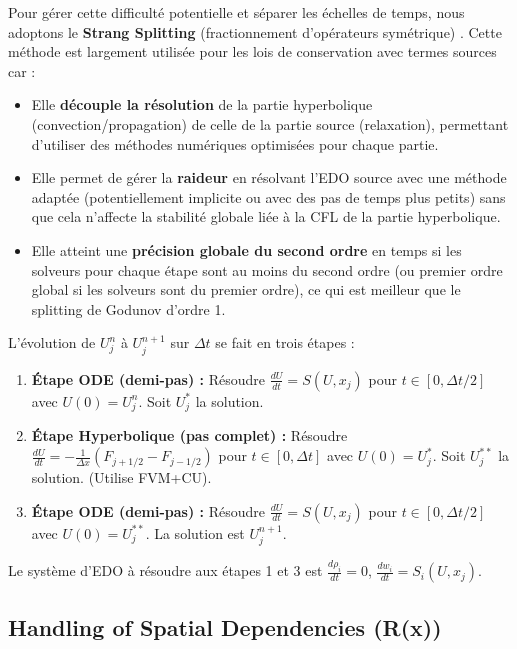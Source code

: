 Pour gérer cette difficulté potentielle et séparer les échelles de temps, nous adoptons le \textbf{Strang Splitting} (fractionnement d'opérateurs symétrique) \cite{Strang1968}. Cette méthode est largement utilisée pour les lois de conservation avec termes sources \cite{LeVeque2002} car :
\begin{itemize}
    \item Elle \textbf{découple la résolution} de la partie hyperbolique (convection/propagation) de celle de la partie source (relaxation), permettant d'utiliser des méthodes numériques optimisées pour chaque partie.
    \item Elle permet de gérer la \textbf{raideur} en résolvant l'EDO source avec une méthode adaptée (potentiellement implicite ou avec des pas de temps plus petits) sans que cela n'affecte la stabilité globale liée à la CFL de la partie hyperbolique.
    \item Elle atteint une \textbf{précision globale du second ordre} en temps si les solveurs pour chaque étape sont au moins du second ordre (ou premier ordre global si les solveurs sont du premier ordre), ce qui est meilleur que le splitting de Godunov d'ordre 1.
\end{itemize}
L'évolution de \( U_j^n \) à \( U_j^{n+1} \) sur \( \Delta t \) se fait en trois étapes :
\begin{enumerate}
    \item \textbf{Étape ODE (demi-pas) :} Résoudre \( \frac{dU}{dt} = S(U, x_j) \) pour \( t \in [0, \Delta t / 2] \) avec \( U(0) = U_j^n \). Soit \( U_j^* \) la solution.
    \item \textbf{Étape Hyperbolique (pas complet) :} Résoudre \( \frac{dU}{dt} = -\frac{1}{\Delta x} ( F_{j+1/2} - F_{j-1/2} ) \) pour \( t \in [0, \Delta t] \) avec \( U(0) = U_j^* \). Soit \( U_j^{**} \) la solution. (Utilise FVM+CU).
    \item \textbf{Étape ODE (demi-pas) :} Résoudre \( \frac{dU}{dt} = S(U, x_j) \) pour \( t \in [0, \Delta t / 2] \) avec \( U(0) = U_j^{**} \). La solution est \( U_j^{n+1} \).
\end{enumerate}
Le système d'EDO à résoudre aux étapes 1 et 3 est \( \frac{d\rho_i}{dt} = 0 \), \( \frac{dw_i}{dt} = S_i(U, x_j) \).

\subsection{Handling of Spatial Dependencies (R(x))}
\label{subsec:spatial_dependencies}

